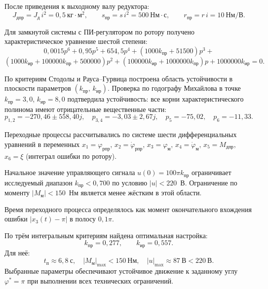 \documentclass[a4paper]{extarticle}
\begin{document}
После приведения к выходному валу редуктора:
\[
J_{\text{дпр}} = J_{\text{д}}\,i^2 = 0{,}5~\text{кг}{\cdot}\text{м}^2,\qquad
s_{\text{пр}} = s\,i^2 = 500~\text{Нм}{\cdot}\text{с},\qquad
r_{\text{пр}} = r\,i = 10~\text{Нм/В}.
\]

Для замкнутой системы с ПИ-регулятором по ротору получено характеристическое
уравнение шестой степени:
\[
0{,}0015p^6+0{,}95p^5+654{,}5p^4+
(1000k_{\text{пр}}+51500)p^3+
\]
\[
(1000k_{\text{ир}}+100000k_{\text{пр}}+500000)p^2+
(100000k_{\text{ир}}+1000000k_{\text{пр}})p+
1000000k_{\text{ир}}=0.
\]

По критериям Стодолы и Рауса--Гурвица построена область устойчивости в плоскости
параметров $(k_{\text{пр}},\,k_{\text{ир}})$. Проверка по годографу Михайлова в
точке $k_{\text{пр}}=3{,}0$, $k_{\text{ир}}=8{,}0$ подтвердила устойчивость:
все корни характеристического полинома имеют отрицательные вещественные части:
\[
p_{1,2}=-270{,}46\pm558{,}40j,\quad
p_{3,4}=-3{,}03\pm2{,}67j,\quad
p_5=-75{,}02,\quad
p_6=-11{,}33.
\]

Переходные процессы рассчитывались по системе шести дифференциальных уравнений в
переменных $x_1=\varphi_{\text{рпр}}$, $x_2=\dot\varphi_{\text{рпр}}$,
$x_3=\varphi_{\text{м}}$, $x_4=\dot\varphi_{\text{м}}$, $x_5=M_{\text{дпр}}$,
$x_6=\xi$ (интеграл ошибки по ротору).

Начальное значение управляющего сигнала $u(0)=100\pi k_{\text{пр}}$ ограничивает
исследуемый диапазон $k_{\text{пр}}<0{,}700$ по условию $|u|<220$~В. Ограничение
по моменту $|M_{\text{м}}|<150$~Нм является менее жёстким в этой области.

Время переходного процесса определялось как момент окончательного вхождения ошибки
$|x_3(t)-\pi|$ в полосу $0{,}1\pi$.

По трём интегральным критериям найдена оптимальная настройка:
\[
\boxed{k_{\text{пр}}=0{,}277,\qquad k_{\text{ир}}=0{,}557.}
\]
Для неё:
\[
t_{\text{п}}\approx 6{,}8~\text{с},\quad
|M_{\text{м}}|_{\max}<150~\text{Нм},\quad
|u|_{\max}\approx87~\text{В}<220~\text{В}.
\]
Выбранные параметры обеспечивают устойчивое движение к заданному углу $\varphi^*=\pi$
при выполнении всех технических ограничений.
\end{document}
